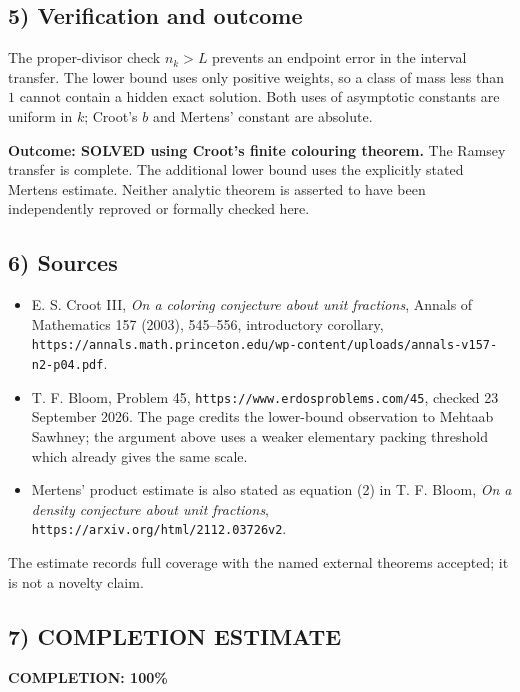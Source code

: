 \subsection{5) Verification and outcome}
The proper-divisor check $n_k>L$ prevents an endpoint error in the
interval transfer. The lower bound uses only positive weights, so a
class of mass less than $1$ cannot contain a hidden exact solution.
Both uses of asymptotic constants are uniform in $k$; Croot's $b$ and
Mertens' constant are absolute.

\textbf{Outcome: SOLVED using Croot's finite colouring theorem.}
The Ramsey transfer is complete. The additional lower bound uses the
explicitly stated Mertens estimate. Neither analytic theorem is
asserted to have been independently reproved or formally checked here.

\subsection{6) Sources}
\begin{itemize}
\item E. S. Croot III, \emph{On a coloring conjecture about unit
fractions}, Annals of Mathematics 157 (2003), 545--556, introductory
corollary, \texttt{https://annals.math.princeton.edu/wp-content/uploads/annals-v157-n2-p04.pdf}.
\item T. F. Bloom, Problem 45,
\texttt{https://www.erdosproblems.com/45}, checked 23 September 2026.
The page credits the lower-bound observation to Mehtaab Sawhney;
the argument above uses a weaker elementary packing threshold which
already gives the same scale.
\item Mertens' product estimate is also stated as equation (2) in
T. F. Bloom, \emph{On a density conjecture about unit fractions},
\texttt{https://arxiv.org/html/2112.03726v2}.
\end{itemize}

The estimate records full coverage with the named external theorems
accepted; it is not a novelty claim.
\subsection{7) COMPLETION ESTIMATE}
\textbf{COMPLETION: 100\%}
